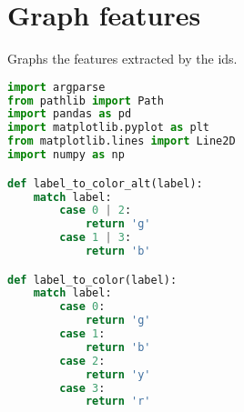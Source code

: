 \section{Graph features}

Graphs the features extracted by the \gls{ids}.

\begin{lstlisting}[language=Python]
import argparse
from pathlib import Path
import pandas as pd
import matplotlib.pyplot as plt
from matplotlib.lines import Line2D
import numpy as np

def label_to_color_alt(label):
    match label:
        case 0 | 2:
            return 'g'
        case 1 | 3:
            return 'b'

def label_to_color(label):
    match label:
        case 0:
            return 'g'
        case 1:
            return 'b'
        case 2:
            return 'y'
        case 3:
            return 'r'


\end{lstlisting}
